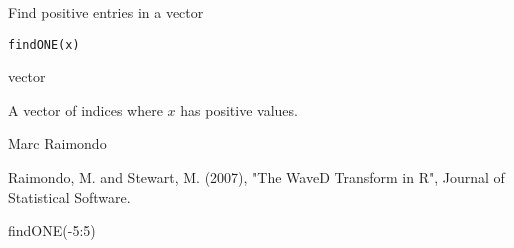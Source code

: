 \documentclass{article}
\begin{document}
\begin{Description}\relax
Find positive entries in a vector
\end{Description}
\begin{Usage}
\begin{verbatim}
findONE(x)
\end{verbatim}
\end{Usage}
\begin{Arguments}
\begin{ldescription}
\item[\code{x}] vector
\end{ldescription}
\end{Arguments}
\begin{Value}
A vector of indices where $x$
has positive values.
\end{Value}
\begin{Author}\relax
Marc Raimondo
\end{Author}
\begin{References}\relax
Raimondo, M. and Stewart, M. (2007),
"The WaveD Transform in R", Journal of Statistical Software.
\end{References}
\begin{SeeAlso}\relax
{}
\end{SeeAlso}
\begin{Examples}
\begin{ExampleCode}findONE(-5:5)
\end{ExampleCode}
\end{Examples}
\end{document}
